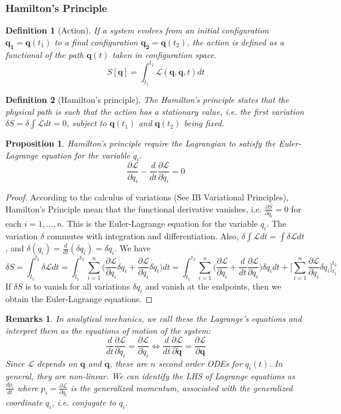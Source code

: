 \documentclass[a4paper]{article}
\newtheorem{defi}{Definition}[section]
\newtheorem{remarks}{Remarks}[section]
\newtheorem{prop}{Proposition}[section]
\theoremstyle{new}
\begin{document}
\subsubsection{Hamilton's Principle}
\begin{defi}[Action]
If a system evolves from an initial configuration $\mathbf{q_1}=\mathbf{q}(t_1)$ to a final configuration $\mathbf{q_2}=\mathbf{q}(t_2)$, the action is defined as a functional of the path $\mathbf{q}(t)$ taken in configuration space.
$$S[\mathbf{q}]=\int_{t_1}^{t_2}\mathcal{L}(\mathbf{q},\mathbf{\dot{q}},t)dt$$
\end{defi}
\begin{defi}[Hamilton's principle]
The Hamilton's principle states that the physical path is such that the action has a stationary value, i.e. the first variation $\delta S=\delta\int\mathcal{L}dt=0$, subject to $\mathbf{q}(t_1)$ and $\mathbf{q}(t_2)$ being fixed. 
\end{defi}
\begin{prop}
Hamilton's principle require the Lagrangian to satisfy the Euler-Lagrange equation for the variable $q_i$.
$$\frac{\partial\mathcal{L}}{\partial q_i}-\frac{d}{dt}\frac{\partial\mathcal{L}}{\partial\dot{q}_i}=0$$
\end{prop}
\begin{proof}
According to the calculus of variations (See IB Variational Principles), Hamilton's Principle mean that the functional derivative vanishes, i.e. $\frac{\partial S}{\partial q_i}=0$ for each $i=1,...,n$. This is the Euler-Lagrange equation for the variable $q_i$. The variation $\delta$ commutes with integration and differentiation. Also, $\delta\int\mathcal{L}dt=\int\delta\mathcal{L}dt$, and $\delta(\dot{q}_i)=\frac{d}{dt}(\delta q_i)=\delta\dot{q}_i$. We have
$$\delta S=\int_{t_1}^{t_2}\delta\mathcal{L}dt=\int_{t_1}^{t_2}\sum_{i=1}^n\bigg(\frac{\partial\mathcal{L}}{\partial q_i}\delta q_i+\frac{\partial\mathcal{L}}{\partial\dot{q}_i}\delta\dot{q}_i\bigg)dt=\int_{t_1}^{t_2}\sum_{i=1}^n\bigg(\frac{\partial\mathcal{L}}{\partial q_i}+\frac{d}{dt}\frac{\partial\mathcal{L}}{\partial q_i}\bigg)\delta q_idt+\bigg[\sum_{i=1}^n\frac{\partial\mathcal{L}}{\partial\dot{q}_i}\delta q_i\bigg]_{t_1}^{t_2}$$
If $\delta S$ is to vanish for all variations $\delta q_i$ and vanish at the endpoints, then we obtain the Euler-Lagrange equations.
\end{proof}
\begin{remarks}
In analytical mechanics, we call these the Lagrange's equations and interpret them as the equations of motion of the system:
$$\frac{d}{dt}\frac{\partial\mathcal{L}}{\partial\dot{q}_i}=\frac{\partial\mathcal{L}}{\partial q_i}\iff\frac{d}{dt}\frac{\partial\mathcal{L}}{\partial\mathbf{\dot{q}}}=\frac{\partial\mathcal{L}}{\partial\mathbf{q}}$$
Since $\mathcal{L}$ depends on $\mathbf{q}$ and $\mathbf{\dot{q}}$, these are $n$ second order ODEs for $q_i(t)$. In general, they are non-linear. We can identify the LHS of Lagrange equations as $\frac{dp_i}{dt}$ where $p_i=\frac{\partial\mathcal{L}}{\partial\dot{q}_i}$ is the generalized momentum, associated with the generalized coordinate $q_i$, i.e. conjugate to $q_i$.
\end{remarks}
\end{document}
